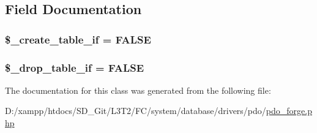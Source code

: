 \subsection{Field Documentation}
\hypertarget{class_c_i___d_b__pdo__forge_a2f6484fcb8d1dc3eef67a637227cd583}{}
\subsubsection[{\$\+\_\+create\+\_\+table\+\_\+if}]{\setlength{\rightskip}{0pt plus 5cm}\$\+\_\+create\+\_\+table\+\_\+if = F\+A\+L\+S\+E\hspace{0.3cm}{\ttfamily [protected]}}\label{class_c_i___d_b__pdo__forge_a2f6484fcb8d1dc3eef67a637227cd583}
\hypertarget{class_c_i___d_b__pdo__forge_a92a8a9145a7fc91e252e58d019373581}{}
\subsubsection[{\$\+\_\+drop\+\_\+table\+\_\+if}]{\setlength{\rightskip}{0pt plus 5cm}\$\+\_\+drop\+\_\+table\+\_\+if = F\+A\+L\+S\+E\hspace{0.3cm}{\ttfamily [protected]}}\label{class_c_i___d_b__pdo__forge_a92a8a9145a7fc91e252e58d019373581}


The documentation for this class was generated from the following file\+:\begin{DoxyCompactItemize}
\item 
D\+:/xampp/htdocs/\+S\+D\+\_\+\+Git/\+L3\+T2/\+F\+C/system/database/drivers/pdo/\hyperlink{pdo__forge_8php}{pdo\+\_\+forge.\+php}\end{DoxyCompactItemize}
